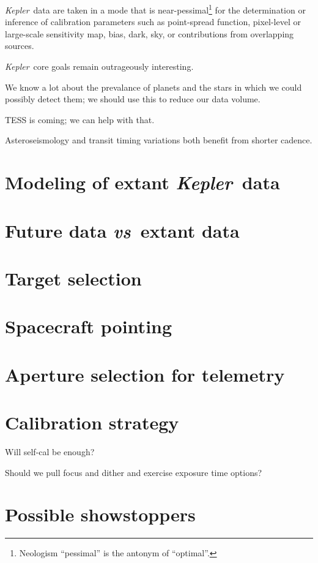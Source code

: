 \documentclass[12pt]{article}
\newcommand{\foreign}[1]{\textit{#1}}
\newcommand{\vs}{\foreign{vs}}
\newcommand{\observatory}[1]{\textsl{#1}}
\newcommand{\kepler}{\observatory{Kepler}}
\newcommand{\Kepler}{\kepler}
\begin{document}
\Kepler\ data are taken in a mode that is
near-pessimal\footnote{Neologism ``pessimal'' is the antonym of
  ``optimal''.} for the determination or inference of calibration
parameters such as point-spread function, pixel-level or large-scale
sensitivity map, bias, dark, sky, or contributions from overlapping
sources.

\Kepler\ core goals remain outrageously interesting.

We know a lot about the prevalance of planets and the stars in which
we could possibly detect them; we should use this to reduce our data
volume.

TESS is coming; we can help with that.

Asteroseismology and transit timing variations both benefit from
shorter cadence.

\section{Modeling of extant \Kepler\ data}\label{sec:extant}

\section{Future data \vs\ extant data}\label{sec:future}

\section{Target selection}\label{sec:target}

\section{Spacecraft pointing}\label{sec:pointing}

\section{Aperture selection for telemetry}\label{sec:telemetry}

\section{Calibration strategy}\label{sec:calibration}

Will self-cal be enough?

Should we pull focus and dither and exercise exposure time options?

\section{Possible showstoppers}\label{sec:stop}
\end{document}
